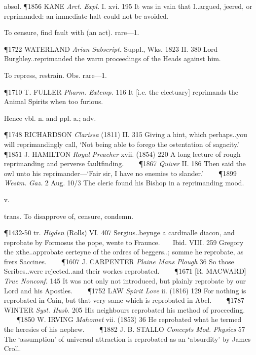 \begin{description}[wide, labelwidth=!, labelindent=0pt]
\begin{myenumerate}
absol. \P 1856 KANE  \textit{Arct. Expl.} I. xvi. 195 It was in vain that I..argued, jeered, or reprimanded: an immediate halt could not be avoided.

 To censure, find fault with (an act). rare—1.

\P 1722 WATERLAND  \textit{Arian Subscript.} Suppl., Wks. 1823 II. 380  Lord Burghley..reprimanded the warm proceedings of the Heads against him.

 To repress, restrain. Obs. rare—1.

\P 1710 T. FULLER  \textit{Pharm. Extemp.} 116 It [i.e. the electuary] reprimands the Animal Spirits when too furious.

\noindent Hence  vbl. n. and ppl. a.;  adv.

\P 1748 RICHARDSON  \textit{Clarissa} (1811) II. 315 Giving a hint, which perhaps..you will reprimandingly call, ‘Not being able to forego the ostentation of sagacity.’    
\P 1851 J. HAMILTON  \textit{Royal Preacher} xvii. (1854) 220 A long lecture of rough reprimanding and perverse faultfinding.    
\P 1867 \textit{Quiver}  II. 186 Then said the owl unto his reprimander—‘Fair sir, I have no enemies to slander.’    
\P 1899  \textit{Westm. Gaz.} 2 Aug. 10/3 The cleric found his Bishop in a reprimanding mood.
\end{myenumerate}


 v.

\noindent {}

\vspace{-0.3cm}

\begin{myenumerate}

 trans. To disapprove of, censure, condemn.

\P 1432-50 tr.  \textit{Higden} (Rolls) VI. 407 Sergius..beynge a cardinalle diacon, and reprobate by Formosus the pope, wente to Fraunce.    Ibid. VIII. 259 Gregory the xthe..approbate certeyne of the ordres of beggers..; somme he reprobate, as frers Saccines.    
\P 1607 J. CARPENTER  \textit{Plaine Mans Plough} 36 So those Scribes..were rejected..and their workes reprobated.    
\P 1671 [R. MACWARD]  \textit{True Nonconf.} 145 It was not only not introduced, but plainly reprobate by our Lord and his Apostles.    
\P 1752 LAW \textit{Spirit Love} ii. (1816) 129 For nothing is reprobated in Cain, but that very same which is reprobated in Abel.    
\P 1787 WINTER  \textit{Syst. Husb.} 205 His neighbours reprobated his method of proceeding.    
\P 1850 W. IRVING  \textit{Mahomet} vii. (1853) 36 He reprobated what he termed the heresies of his nephew.    
\P 1882 J. B. STALLO  \textit{Concepts Mod. Physics} 57 The ‘assumption’ of universal attraction is reprobated as an ‘absurdity’ by James Croll.


\end{myenumerate}
\end{description}
